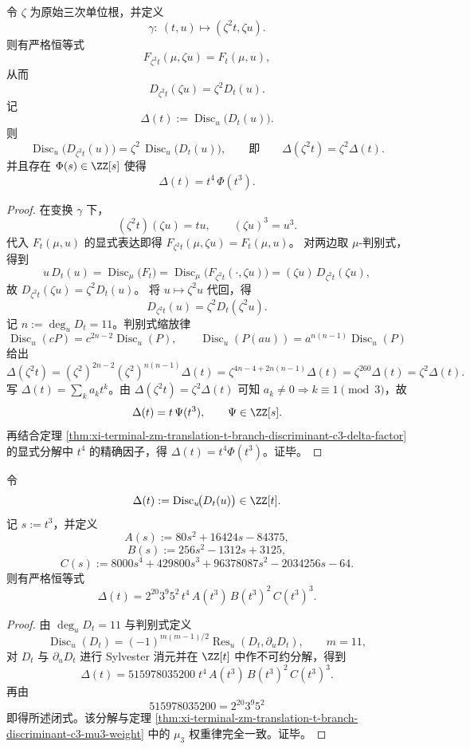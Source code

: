 \begin{theorem}\label{thm:xi-terminal-zm-translation-t-branch-discriminant-c3-mu3-weight}
令 \(\zeta\) 为原始三次单位根，并定义
\[
\gamma:\ (t,u)\longmapsto(\zeta^2 t,\zeta u).
\]
则有严格恒等式
\[
F_{\zeta^2 t}(\mu,\zeta u)=F_t(\mu,u),
\]
从而
\[
D_{\zeta^2 t}(\zeta u)=\zeta^2D_t(u).
\]
记
\[
\Delta(t):=\operatorname{Disc}_u\!\bigl(D_t(u)\bigr).
\]
则
\[
\operatorname{Disc}_{u}\!\bigl(D_{\zeta^2 t}(u)\bigr)=\zeta^2\,\operatorname{Disc}_{u}\!\bigl(D_t(u)\bigr),
\qquad\text{即}\qquad
\Delta(\zeta^2 t)=\zeta^2\Delta(t).
\]
并且存在 \(\Phi(s)\in\ZZ[s]\) 使得
\[
\Delta(t)=t^4\,\Phi(t^3).
\]
\end{theorem}
\begin{proof}
在变换 \(\gamma\) 下，
\[
(\zeta^2 t)(\zeta u)=tu,\qquad (\zeta u)^3=u^3.
\]
代入 \(F_t(\mu,u)\) 的显式表达即得 \(F_{\zeta^2 t}(\mu,\zeta u)=F_t(\mu,u)\)。
对两边取 \(\mu\)-判别式，得到
\[
u\,D_t(u)=\operatorname{Disc}_{\mu}\!\bigl(F_t\bigr)
=\operatorname{Disc}_{\mu}\!\bigl(F_{\zeta^2 t}(\cdot,\zeta u)\bigr)
=(\zeta u)\,D_{\zeta^2 t}(\zeta u),
\]
故 \(D_{\zeta^2 t}(\zeta u)=\zeta^2D_t(u)\)。
将 \(u\mapsto \zeta^2u\) 代回，得
\[
D_{\zeta^2 t}(u)=\zeta^2D_t(\zeta^2u).
\]
记 \(n:=\deg_u D_t=11\)。判别式缩放律
\[
\operatorname{Disc}_u(cP)=c^{2n-2}\operatorname{Disc}_u(P),\qquad
\operatorname{Disc}_u(P(au))=a^{n(n-1)}\operatorname{Disc}_u(P)
\]
给出
\[
\Delta(\zeta^2 t)
=(\zeta^2)^{2n-2}(\zeta^2)^{n(n-1)}\Delta(t)
=\zeta^{4n-4+2n(n-1)}\Delta(t)
=\zeta^{260}\Delta(t)
=\zeta^2\Delta(t).
\]
写 \(\Delta(t)=\sum_k a_k t^k\)。由 \(\Delta(\zeta^2 t)=\zeta^2\Delta(t)\) 可知 \(a_k\neq 0\Rightarrow k\equiv 1\pmod 3\)，故
\[
\Delta(t)=t\,\Psi(t^3),\qquad \Psi\in\ZZ[s].
\]
再结合定理 \ref{thm:xi-terminal-zm-translation-t-branch-discriminant-c3-delta-factor} 的显式分解中 \(t^4\) 的精确因子，得 \(\Delta(t)=t^4\Phi(t^3)\)。证毕。
\end{proof}

\begin{theorem}[二次判别式 \texorpdfstring{$\Delta(t)=\operatorname{Disc}_u(D_t)$}{Delta(t)=Disc_u(Dt)} 的完全闭式分解]\label{thm:xi-terminal-zm-translation-t-branch-discriminant-c3-delta-factor}
令
\[
\Delta(t):=\operatorname{Disc}_u\!\bigl(D_t(u)\bigr)\in\ZZ[t].
\]
记 \(s:=t^3\)，并定义
\[
A(s):=80s^2+16424s-84375,
\]
\[
B(s):=256s^2-1312s+3125,
\]
\[
C(s):=8000s^4+429800s^3+96378087s^2-2034256s-64.
\]
则有严格恒等式
\[
\boxed{
\Delta(t)
=2^{20}3^{9}5^{2}\,t^4\,A(t^3)\,B(t^3)^2\,C(t^3)^3.}
\]
\end{theorem}
\begin{proof}
由 \(\deg_u D_t=11\) 与判别式定义
\[
\operatorname{Disc}_u(D_t)=(-1)^{m(m-1)/2}\operatorname{Res}_u(D_t,\partial_u D_t),\qquad m=11,
\]
对 \(D_t\) 与 \(\partial_u D_t\) 进行 Sylvester 消元并在 \(\ZZ[t]\) 中作不可约分解，得到
\[
\Delta(t)=515978035200\;t^4\,A(t^3)\,B(t^3)^2\,C(t^3)^3.
\]
再由
\[
515978035200=2^{20}3^{9}5^{2}
\]
即得所述闭式。该分解与定理
\ref{thm:xi-terminal-zm-translation-t-branch-discriminant-c3-mu3-weight}
中的 \(\mu_3\) 权重律完全一致。证毕。
\end{proof}

